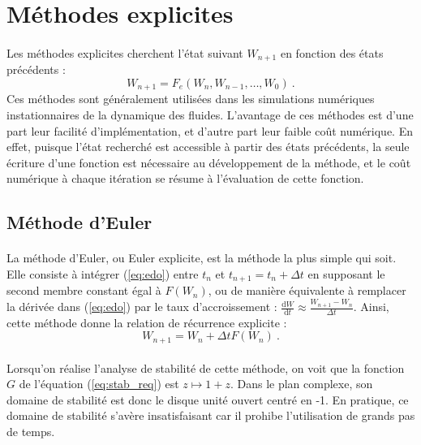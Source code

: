\section{Méthodes explicites}

  \paragraph{}
  Les méthodes explicites cherchent l'état suivant $W_{n+1}$ en fonction des états précédents :
  \[W_{n+1} = F_e\left(W_n, W_{n-1}, \dots, W_0\right)\ .\]
  Ces méthodes sont généralement utilisées dans les simulations numériques instationnaires de la dynamique des fluides.
  L'avantage de ces méthodes est d'une part leur facilité d'implémentation, et d'autre part leur faible coût numérique.
  En effet, puisque l'état recherché est accessible à partir des états précédents, la seule écriture d'une fonction est nécessaire au développement de la méthode, et le coût numérique à chaque itération se résume à l'évaluation de cette fonction.

  \subsection{Méthode d'Euler}

    \paragraph{}
    La méthode d'Euler, ou Euler explicite, est la méthode la plus simple qui soit.
    Elle consiste à intégrer (\ref{eq:edo}) entre $t_n$ et $t_{n+1} = t_n + \Delta t$ en supposant le second membre constant égal à $F\left(W_n\right)$, ou de manière équivalente à remplacer la dérivée dans (\ref{eq:edo}) par le taux d'accroissement : $\frac{\mathrm{d}W}{\mathrm{d}t}\approx\frac{W_{n+1}-W_n}{\Delta t}$.
    Ainsi, cette méthode donne la relation de récurrence explicite :
    \[W_{n+1} = W_n + \Delta t F\left(W_n\right)\ .\]

    \paragraph{}
    Lorsqu'on réalise l'analyse de stabilité de cette méthode, on voit que la fonction $G$ de l'équation (\ref{eq:stab_req}) est $z\mapsto 1 + z$.
    Dans le plan complexe, son domaine de stabilité est donc le disque unité ouvert centré en -1.
    En pratique, ce domaine de stabilité s'avère insatisfaisant car il prohibe l'utilisation de grands pas de temps.


